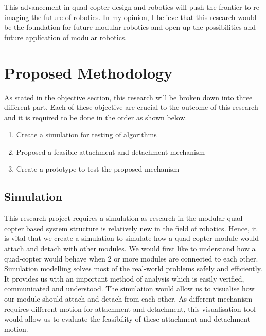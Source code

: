 \documentclass[12pt,A4]{article}
\begin{document}
	This advancement in quad-copter design and robotics will push the frontier to re-imaging the future of robotics. In my opinion, I believe that this research would be the foundation for future modular robotics and open up the possibilities and future application of modular robotics.\\

	\section{Proposed Methodology}
	
	As stated in the objective section, this research will be broken down into three different part. Each of these objective are crucial to the outcome of this research and it is required to be done in the order as shown below.
	
	\begin{enumerate}
		\item Create a simulation for testing of algorithms
		\item Proposed a feasible attachment and detachment mechanism
		\item Create a prototype to test the proposed mechanism
	\end{enumerate}
	
	\subsection{Simulation}
	
	This research project requires a simulation as research in the modular quad-copter based system structure is relatively new in the field of robotics. Hence, it is vital that we create a simulation to simulate how a quad-copter module would attach and detach with other modules. We would first like to understand how a quad-copter would behave when 2 or more modules are connected to each other.\\ %
	
	Simulation modelling solves most of the real-world problems safely and efficiently. It provides us with an important method of analysis which is easily verified, communicated and understood. The simulation would allow us to visualise how our module should attach and detach from each other. As different mechanism requires different motion for attachment and detachment, this visualisation tool would allow us to evaluate the feasibility of these attachment and detachment motion.\\
	
\end{document}
